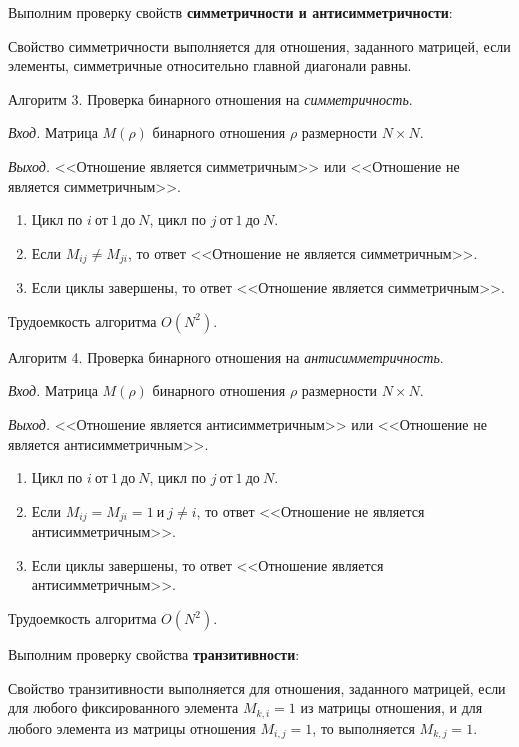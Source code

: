 \documentclass[bachelor, och, labwork]{shiza}
\begin{document}
Выполним проверку свойств \textbf{симметричности и антисимметричности}:

Свойство симметричности выполняется для отношения, заданного матрицей, если
элементы, симметричные относительно главной диагонали равны.

Алгоритм 3. Проверка бинарного отношения на \textit{симметричность}.

\textit{Вход.} Матрица $M(\rho)$ бинарного отношения $\rho$ размерности
$N \times N$.

\textit{Выход.} <<Отношение является симметричным>> или <<Отношение не является
симметричным>>.

\begin{enumerate}
    \item Цикл по $i ~\text{от}~ 1 ~\text{до}~ N$, 
    цикл по $j ~\text{от}~ 1 ~\text{до}~ N$.

    \item Если $M_{ij} \not= M_{ji}$, то ответ <<Отношение не является симметричным>>.
    
    \item Если циклы завершены, то ответ <<Отношение является симметричным>>.

\end{enumerate}
Трудоемкость алгоритма $O(N^2)$.

Алгоритм 4. Проверка бинарного отношения на \textit{антисимметричность}.

\textit{Вход.} Матрица $M(\rho)$ бинарного отношения $\rho$ размерности
$N \times N$.

\textit{Выход.} <<Отношение является антисимметричным>> или <<Отношение не является
антисимметричным>>.

\begin{enumerate}
    \item Цикл по $i ~\text{от}~ 1 ~\text{до}~ N$, 
    цикл по $j ~\text{от}~ 1 ~\text{до}~ N$.

    \item Если $M_{ij} = M_{ji} = 1 ~\text{и}~ j \ne i$, то ответ <<Отношение не является антисимметричным>>.
    
    \item Если циклы завершены, то ответ <<Отношение является антисимметричным>>.

\end{enumerate}
Трудоемкость алгоритма $O(N^2)$.

Выполним проверку свойства \textbf{транзитивности}:

Свойство транзитивности выполняется для отношения, заданного матрицей, если для 
любого фиксированного элемента $M_{k,i}=1$ из матрицы отношения, и для любого
элемента из матрицы отношения $M_{i,j}=1$, то выполняется $M_{k,j}=1$.
\end{document}
